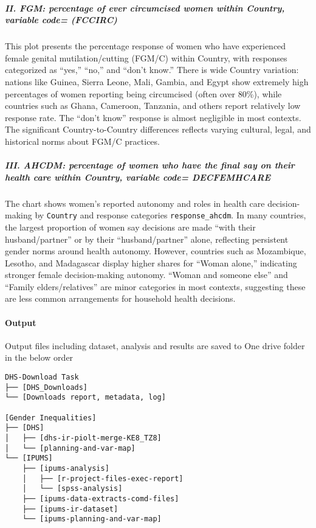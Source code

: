 \documentclass[
]{article}
\begin{document}
\subparagraph{II. FGM: percentage of ever circumcised women within
Country, variable code=
(FCCIRC)}\label{ii.-fgm-percentage-of-ever-circumcised-women-within-country-variable-code-fccirc}

This plot presents the percentage response of women who have experienced
female genital mutilation/cutting (FGM/C) within Country, with responses
categorized as ``yes,'' ``no,'' and ``don't know.'' There is wide
Country variation: nations like Guinea, Sierra Leone, Mali, Gambia, and
Egypt show extremely high percentages of women reporting being
circumcised (often over 80\%), while countries such as Ghana, Cameroon,
Tanzania, and others report relatively low response rate. The ``don't
know'' response is almost negligible in most contexts. The significant
Country-to-Country differences reflects varying cultural, legal, and
historical norms about FGM/C practices.

\subparagraph{III. AHCDM: percentage of women who have the final say on
their health care within Country, variable code=
DECFEMHCARE}\label{iii.-ahcdm-percentage-of-women-who-have-the-final-say-on-their-health-care-within-country-variable-code-decfemhcare}

The chart shows women's reported autonomy and roles in health care
decision-making by \texttt{Country} and response categories
\texttt{response\_ahcdm}. In many countries, the largest proportion of
women say decisions are made ``with their husband/partner'' or by their
``husband/partner'' alone, reflecting persistent gender norms around
health autonomy. However, countries such as Mozambique, Lesotho, and
Madagascar display higher shares for ``Woman alone,'' indicating
stronger female decision-making autonomy. ``Woman and someone else'' and
``Family elders/relatives'' are minor categories in most contexts,
suggesting these are less common arrangements for household health
decisions.

\paragraph{Output}\label{output}

Output files including dataset, analysis and results are saved to One
drive folder in the below order

\begin{verbatim}
DHS-Download Task
├── [DHS_Downloads]
└── [Downloads report, metadata, log]

[Gender Inequalities]
├── [DHS]
│   ├── [dhs-ir-piolt-merge-KE8_TZ8]
│   └── [planning-and-var-map]
└── [IPUMS]
    ├── [ipums-analysis]
    │   ├── [r-project-files-exec-report]
    │   └── [spss-analysis]
    ├── [ipums-data-extracts-comd-files]
    ├── [ipums-ir-dataset]
    └── [ipums-planning-and-var-map]

    
\end{verbatim}
\end{document}
